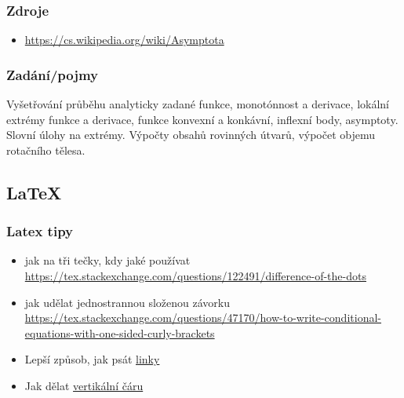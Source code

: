 \documentclass[12pt]{article}
\begin{document}
\subsubsection{Zdroje}
\begin{itemize}
\item \url{https://cs.wikipedia.org/wiki/Asymptota}
\end{itemize}
\subsubsection{Zadání/pojmy}
Vyšetřování průběhu analyticky zadané funkce, monotónnost a derivace, lokální extrémy funkce a derivace, funkce konvexní a konkávní, inflexní body, asymptoty. Slovní úlohy na extrémy. Výpočty obsahů rovinných útvarů, výpočet objemu rotačního tělesa.
\newpage
\tableofcontents
\appendix
{}
\subsection{\LaTeX}
\subsubsection{Latex tipy}
\begin{itemize}
\item jak na tři tečky, kdy jaké používat \url{https://tex.stackexchange.com/questions/122491/difference-of-the-dots}
\item jak udělat jednostrannou složenou závorku \url{https://tex.stackexchange.com/questions/47170/how-to-write-conditional-equations-with-one-sided-curly-brackets}
\item Lepší způsob, jak psát \href{https://www.latex-tutorial.com/tutorials/hyperlinks/}{linky}
\item Jak dělat \href{https://tex.stackexchange.com/questions/498/mid-vertical-bar-vert-lvert-rvert-divides}{vertikální čáru}
\end{itemize}
\end{document}
